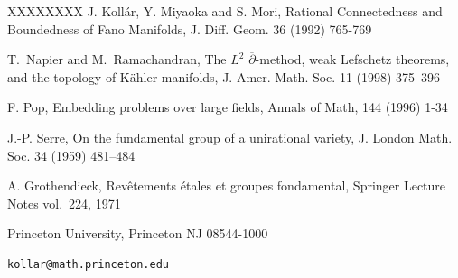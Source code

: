 \documentclass[12pt,twoside]{amsart}
\theoremstyle{definition}
\theoremstyle{remark}
\begin{document}
\begin{thebibliography}{XXXXXXXX}
 J. Koll\'ar, Y. Miyaoka  and S. Mori, 
Rational Connectedness and Boundedness of  Fano Manifolds,  J. Diff.
Geom. 36 (1992) 765-769



 T.\ Napier and M.\ Ramachandran, The $L^2$ $\overline \partial$-method, weak
  Lefschetz
theorems, and the topology of K\"ahler manifolds, 
J. Amer. Math. Soc. 11 (1998)
 375--396

 F. Pop, Embedding problems over large fields,
Annals  of Math, 144 (1996) 1-34

 J.-P. Serre, 
On the fundamental group of a unirational variety,
J. London Math. Soc. 34 (1959) 481--484 


   A.   Grothendieck, Rev\^etements \'etales et
groupes fondamental, Springer Lecture Notes vol.\ 224, 1971

\end{thebibliography}

\vskip1cm


\noindent Princeton University, Princeton NJ 08544-1000

\begin{verbatim}kollar@math.princeton.edu\end{verbatim}
\end{document}
